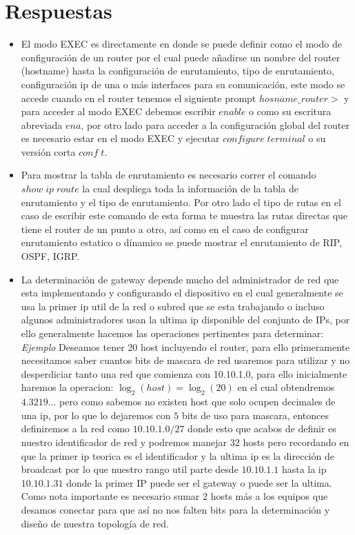 \documentclass[10pt]{article}
\begin{document}
\section{Respuestas}
\begin{itemize}
  \item El modo EXEC es directamente en donde se puede definir como el modo de configuración de un router por el cual puede añadirse un nombre del router (hostname) hasta la configuración de enrutamiento, tipo de enrutamiento, configuración ip de una o más interfaces para su comunicación, este modo se accede cuando en el router tenemos el siguiente prompt $hosname\_router>$ y para acceder al modo EXEC debemos escribir $enable$ o como su escritura abreviada $ena$, por otro lado para acceder a la configuración global del router es necesario estar en el modo EXEC y ejecutar $configure\;terminal$ o su versión corta $conf\;t$.
  \item Para mostrar la tabla de enrutamiento es necesario correr el comando $show\;ip\; route$ la cual despliega toda la información de la tabla de enrutamiento y el tipo de enrutamiento. Por otro lado el tipo de rutas en el caso de escribir este comando de esta forma te muestra las rutas directas que tiene el router de un punto a otro, así como en el caso de configurar enrutamiento estatico o dínamico se puede mostrar el enrutamiento de RIP, OSPF, IGRP.
  \item La determinación de gateway depende mucho del administrador de red que esta implementando y configurando el dispositivo en el cual generalmente se usa la primer ip util de la red o subred que se esta trabajando o incluso algunos administradores usan la ultima ip disponible del conjunto de IPs, por ello generalmente hacemos las operaciones pertinentes para determinar:\\
  \textit{Ejemplo}
  Deseamos tener 20 host incluyendo el router, para ello primeramente necesitamos saber cuantos bits de mascara de red usaremos para utilizar y no desperdiciar tanto una red que comienza con 10.10.1.0, para ello inicialmente haremos la operacion: \(\displaystyle \log_{2}\left(host\right)=\log_{2}\left(20\right)\) en el cual obtendremos $4.3219...$ pero como sabemos no existen host que solo ocupen decimales de una ip, por lo que lo dejaremos con $5$ bits de uso para mascara, entonces definiremos a la red como $10.10.1.0/27$ donde esto que acabos de definir es nuestro identificador de red y podremos manejar $32$ hosts pero recordando en que la primer ip teorica es el identificador y la ultima ip es la dirección de broadcast por lo que nuestro rango util parte desde $10.10.1.1$ hasta la ip $10.10.1.31$ donde la primer IP puede ser el gateway o puede ser la ultima. Como nota importante es necesario sumar 2 hosts más a los equipos que desamos conectar para que así no nos falten bits para la determinación y diseño de nuestra topología de red.

\end{itemize}
\end{document}
